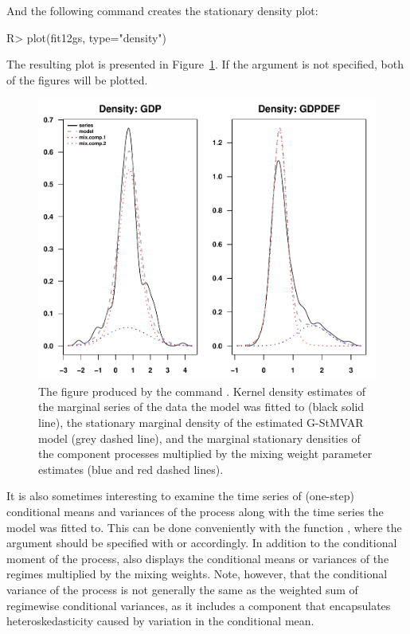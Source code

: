 \documentclass[nojss]{jss}
\begin{document}
And the following command creates the stationary density plot:
%
\begin{CodeChunk}
\begin{CodeInput}
R> plot(fit12gs, type="density")
\end{CodeInput}
\end{CodeChunk}
%
The resulting plot is presented in Figure~\ref{fig:densityplot}. If the argument  is not specified, both of the figures will be plotted.

\begin{figure}[t]
  \centering
  \includegraphics{figures/densityplot.pdf}
  \caption{The figure produced by the command . Kernel density estimates of the marginal series of the data the model was fitted to (black solid line), the stationary marginal density of the estimated G-StMVAR model (grey dashed line), and the marginal stationary densities of the component processes multiplied by the mixing weight parameter estimates (blue and red dashed lines).}
\label{fig:densityplot}
\end{figure}

It is also sometimes interesting to examine the time series of (one-step) conditional means and variances of the process along with the time series the model was fitted to. This can be done conveniently with the function , where the argument  should be specified with  or  accordingly. In addition to the conditional moment of the process,  also displays the conditional means or variances of the regimes multiplied by the mixing weights. Note, however, that the conditional variance of the process is not generally the same as the weighted sum of regimewise conditional variances, as it includes a component that encapsulates heteroskedasticity caused by variation in the conditional mean.
\end{document}
